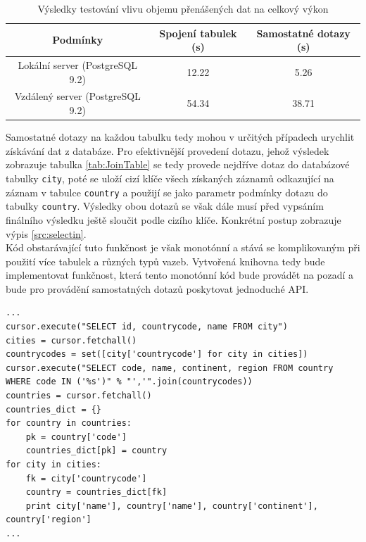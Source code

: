 \documentclass[ing,male,java,dept456]{diploma}						%
\begin{document}
\begin{table}
  \centering
  \begin{tabular}{|c|c|c|}
    \hline
    Podmínky & Spojení tabulek (s) & Samostatné dotazy (s)\\
    \hline
    Lokální server (PostgreSQL 9.2) & 12.22 & 5.26 \\
    \hline
    Vzdálený server (PostgreSQL 9.2) & 54.34 & 38.71 \\
    \hline
  \end{tabular}
  \caption{Výsledky testování vlivu objemu přenášených dat na celkový výkon}
  \label{tab:ProofTable}
\end{table}

Samostatné dotazy na každou tabulku tedy mohou v určitých případech urychlit získávání dat z databáze. Pro efektivnější provedení dotazu, jehož výsledek zobrazuje tabulka \ref{tab:JoinTable} se tedy provede nejdříve dotaz do databázové tabulky \lstinline[style=inlinepython]|city|, poté se uloží cizí klíče všech získaných záznamů odkazující na záznam v tabulce \lstinline[style=inlinepython]|country| a použijí se jako parametr podmínky dotazu do tabulky \lstinline[style=inlinepython]|country|. Výsledky obou dotazů se však dále musí před vypsáním finálního výsledku ještě sloučit podle cizího klíče. Konkrétní postup zobrazuje výpis \ref{src:selectin}. \\
Kód obstarávající tuto funkčnost je však monotónní a stává se komplikovaným při použití více tabulek a různých typů vazeb. Vytvořená knihovna tedy bude implementovat funkčnost, která tento monotónní kód bude provádět na pozadí a bude pro provádění samostatných dotazů poskytovat jednoduché API. \\

\clearpage

\begin{lstlisting}[style=custompython, label=src:selectin, caption={Získávání dat pomocí samostatných dotazů}]
...
cursor.execute("SELECT id, countrycode, name FROM city")
cities = cursor.fetchall()
countrycodes = set([city['countrycode'] for city in cities])
cursor.execute("SELECT code, name, continent, region FROM country WHERE code IN ('%s')" % "','".join(countrycodes))
countries = cursor.fetchall()
countries_dict = {}
for country in countries:
    pk = country['code']
    countries_dict[pk] = country
for city in cities:
    fk = city['countrycode']
    country = countries_dict[fk]
    print city['name'], country['name'], country['continent'], country['region']
...
\end{lstlisting}
\end{document}
